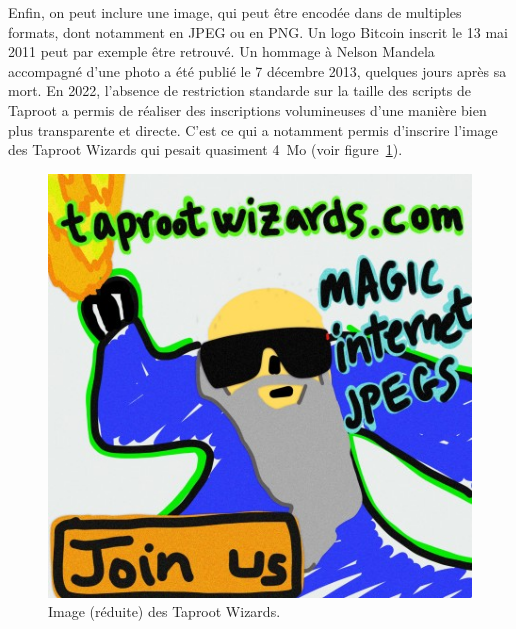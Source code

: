 Enfin, on peut inclure une image, qui peut être encodée dans de multiples formats, dont notamment en JPEG ou en PNG. Un logo Bitcoin inscrit le 13 mai 2011 peut par exemple être retrouvé. Un hommage à Nelson Mandela accompagné d'une photo a été publié le 7 décembre 2013, quelques jours après sa mort. En 2022, l'absence de restriction standarde sur la taille des scripts de Taproot a permis de réaliser des inscriptions volumineuses d'une manière bien plus transparente et directe. C'est ce qui a notamment permis d'inscrire l'image des Taproot Wizards qui pesait quasiment 4~Mo (voir figure~\ref{fig:taproot-wizards}).

\begin{figure}[h]
  \centering
  \includegraphics[scale=0.6]{img/taproot-wizards-small-0301e0480b374b32851a9462db29dc19fe830a7f7d7a88b81612b9d42099c0aei0.jpg}
  \caption{Image (réduite) des Taproot Wizards.}
  \label{fig:taproot-wizards}
\end{figure}

